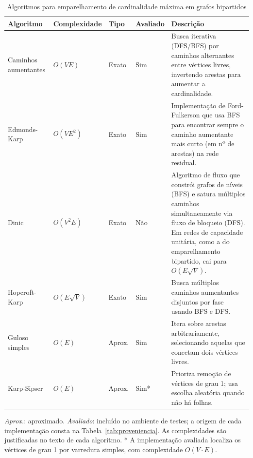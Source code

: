 \begin{table}[H]
    \centering
    \caption{Algoritmos para emparelhamento de cardinalidade máxima em grafos bipartidos}
    \label{tab:emp_card_max_bip_algos}
    \renewcommand{\arraystretch}{1.2} %
    \footnotesize
    
    \begin{tabularx}{\textwidth}{@{} >{\raggedright\arraybackslash}p{2.8cm} l l l >{\raggedright\arraybackslash}X @{}}
        \toprule
        \textbf{Algoritmo} & \textbf{Complexidade} & \textbf{Tipo} & \textbf{Avaliado} & \textbf{Descrição} \\
        \midrule
        
        Caminhos aumentantes & $O(VE)$ & Exato & Sim & 
        Busca iterativa (DFS/BFS) por caminhos alternantes entre vértices livres, invertendo arestas para aumentar a cardinalidade. \\
        \addlinespace 
        
        Edmonds-Karp & $O(VE^2)$ & Exato & Sim & 
        Implementação de Ford-Fulkerson que usa BFS para encontrar sempre o caminho aumentante mais curto (em nº de arestas) na rede residual. \\
        \addlinespace
        
        Dinic & $O(V^2E)$ & Exato & Não & 
        Algoritmo de fluxo que constrói grafos de níveis (BFS) e satura múltiplos caminhos simultaneamente via fluxo de bloqueio (DFS). Em redes de capacidade unitária, como a do emparelhamento bipartido, cai para $O(E\sqrt{V})$. \\
        \addlinespace
        
        Hopcroft-Karp & $O(E\sqrt{V})$ & Exato & Sim & 
        Busca múltiplos caminhos aumentantes disjuntos por fase usando BFS e DFS. \\
        \addlinespace
        
        Guloso simples & $O(E)$ & Aprox. & Sim & 
        Itera sobre arestas arbitrariamente, selecionando aquelas que conectam dois vértices livres. \\
        \addlinespace

        Karp-Sipser & $O(E)$ & Aprox. & Sim* & 
        Prioriza remoção de vértices de grau 1; usa escolha aleatória quando não há folhas. \\
        
        \bottomrule
    \end{tabularx}
    \par\smallskip
    {\raggedright\footnotesize \textit{Aprox.}: aproximado. \textit{Avaliado}: incluído no ambiente de testes; a origem de cada implementação consta na Tabela~\ref{tab:proveniencia}. As complexidades são justificadas no texto de cada algoritmo. * A implementação avaliada localiza os vértices de grau 1 por varredura simples, com complexidade $O(V \cdot E)$.\par}
\end{table}


